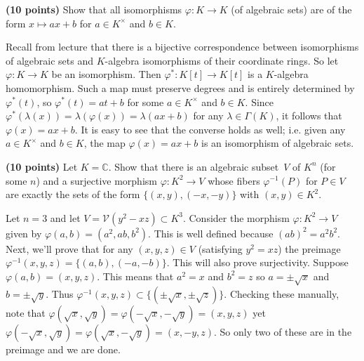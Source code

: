 \documentclass[11pt,letterpaper]{article}
\begin{document}
\begin{problem}
    \textbf{(10 points)} Show that all isomorphisms $\varphi:K\rightarrow K$ (of algebraic sets) are of the form $x\mapsto ax+b$ for $a\in K^\times$ and $b\in K$.
\end{problem}

\begin{solution}
    Recall from lecture that there is a bijective correspondence between isomorphisms of algebraic sets and $K$-algebra isomorphisms of their coordinate rings. So let $\varphi : K \to K$ be an isomorphism. Then $\varphi^* : K[t] \to K[t]$ is a $K$-algebra homomorphism. Such a map must preserve degrees and is entirely determined by $\varphi^*(t)$, so $\varphi^*(t)=at+b$ for some $a\in K^\times$ and $b\in K$. Since $\varphi^*(\lambda(x))=\lambda(\varphi(x)) = \lambda(ax+b)$ for any $\lambda\in \Gamma(K)$, it follows that $\varphi(x) = ax+b$. It is easy to see that the converse holds as well; i.e. given any $a\in K^\times$ and $b\in K$, the map $\varphi(x)=ax+b$ is an isomorphism of algebraic sets.
\end{solution}

\begin{problem}
    \textbf{(10 points)} Let $K=\mathbb C$. Show that there is an algebraic subset~$V$ of $K^n$ (for some $n$) and a surjective morphism $\varphi:K^2\rightarrow V$ whose fibers $\varphi^{-1}(P)$ for $P\in V$ are exactly the sets of the form $\{(x,y),(-x,-y)\}$ with $(x,y)\in K^2$.
\end{problem}

\begin{solution}
    Let $n=3$ and let $V=\mathcal{V}(y^2-xz)\subset K^3$. Consider the morphism $\varphi : K^2 \to V$ given by $\varphi(a,b)=(a^2,ab,b^2)$. This is well defined because $(ab)^2=a^2b^2$. Next, we'll prove that for any $(x,y,z)\in V$ (satisfying $y^2=xz$) the preimage $\varphi^{-1}(x,y,z)=\{(a,b), (-a,-b)\}$. This will also prove surjectivity. Suppose $\varphi(a,b)=(x,y,z)$. This means that $a^2=x$ and $b^2=z$ so $a=\pm\sqrt{x}$ and $b=\pm\sqrt{y}$. Thus $\varphi^{-1}(x,y,z)\subset \{(\pm \sqrt{x}, \pm \sqrt{z})\}$. Checking these manually, note that $\varphi(\sqrt{x},\sqrt{y})=\varphi(-\sqrt{x}, -\sqrt{y})=(x,y,z)$ yet $\varphi(-\sqrt{x}, \sqrt{y})=\varphi(\sqrt{x}, -\sqrt{y})=(x,-y,z)$. So only two of these are in the preimage and we are done.
\end{solution}
\end{document}
